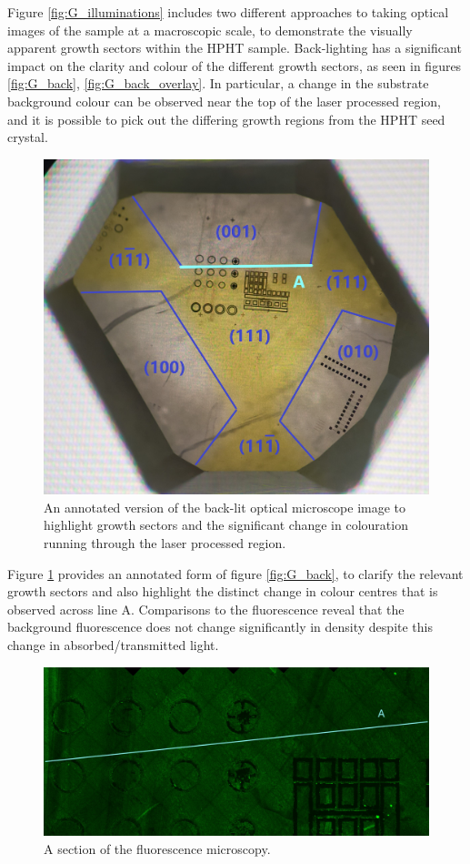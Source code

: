 \begin{refsection}
Figure \ref{fig:G_illuminations} includes two different approaches to taking optical images of the sample at a macroscopic scale, to demonstrate the visually apparent growth sectors within the HPHT sample. Back-lighting has a significant impact on the clarity and colour of the different growth sectors, as seen in figures \ref{fig:G_back}, \ref{fig:G_back_overlay}. In particular, a change in the substrate background colour can be observed near the top of the laser processed region, and it is possible to pick out the differing growth regions from the HPHT seed crystal.

\begin{figure}[H]
    \centering
    \includegraphics[width=0.8\linewidth]{Chapter7/Figs/Raster/48MP white 5 aperture graphite focus_crop_annotated 1_low.jpg}
    \caption{An annotated version of the back-lit optical microscope image to highlight growth sectors and the significant change in colouration running through the laser processed region.}
    \label{fig:G_annotated}
\end{figure}

Figure \ref{fig:G_annotated} provides an annotated form of figure \ref{fig:G_back}, to clarify the relevant growth sectors and also highlight the distinct change in colour centres that is observed across line A. Comparisons to the fluorescence reveal that the background fluorescence does not change significantly in density despite this change in absorbed/transmitted light.

\begin{figure}[H]
    \centering
    \includegraphics[width=0.8\linewidth]{Chapter7/Figs/Raster/FL_crop 3_low_annotated.jpg}
    \caption{A section of the fluorescence microscopy.}
    \label{fig:fl_crop3}
\end{figure}


\end{refsection}
